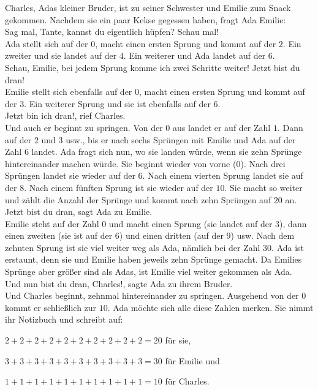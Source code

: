 Charles, Adas kleiner Bruder, ist zu seiner Schwester und Emilie zum Snack gekommen. Nachdem sie ein paar Kekse gegessen haben, fragt Ada Emilie: \\
\frqq{}Sag mal, Tante, kannst du eigentlich hüpfen? Schau mal!\flqq{}\\
Ada stellt sich auf der $0$, macht einen ersten Sprung und kommt auf der $2$. Ein zweiter und sie landet auf der $4$. Ein weiterer und Ada landet auf der $6$.\\
\frqq{}Schau, Emilie, bei jedem Sprung komme ich zwei Schritte weiter! Jetzt bist du dran!\flqq{}\\
Emilie stellt sich ebenfalls auf der $0$, macht einen ersten Sprung und kommt auf der $3$. Ein weiterer Sprung und sie ist ebenfalls auf der $6$.\\
\frqq{}Jetzt bin ich dran!\flqq{}, rief Charles.\\
Und auch er beginnt zu springen. Von der $0$ aus landet er auf der Zahl $1$. Dann auf der $2$ und $3$ usw., bis er nach sechs Sprüngen mit Emilie und Ada auf der Zahl $6$ landet.
Ada fragt sich nun, wo sie landen würde, wenn sie zehn Sprünge hintereinander machen würde. 
Sie beginnt wieder von vorne ($0$). Nach drei Sprüngen landet sie wieder auf der $6$. 
Nach einem vierten Sprung landet sie auf der $8$. 
Nach einem fünften Sprung ist sie wieder auf der $10$. Sie macht so weiter und zählt die Anzahl der Sprünge und kommt nach zehn Sprüngen auf $20$ an. \\
\frqq{}Jetzt bist du dran\flqq{}, sagt Ada zu Emilie.\\
Emilie steht auf der Zahl $0$ und macht einen Sprung (sie landet auf der $3$), dann einen zweiten (sie ist auf der $6$) und einen dritten (auf der $9$) usw. Nach dem zehnten Sprung ist sie viel weiter weg als Ada, nämlich bei der Zahl $30$.
Ada ist erstaunt, denn sie und Emilie haben jeweils zehn Sprünge gemacht. Da Emilies Sprünge aber größer sind als Adas, ist Emilie viel weiter gekommen als Ada.\\ 
\frqq{}Und nun bist du dran, Charles!\flqq{}, sagte Ada zu ihrem Bruder.\\
Und Charles beginnt, zehnmal hintereinander zu springen. Ausgehend von der $0$ kommt er schließlich zur $10$.
Ada möchte sich alle diese Zahlen merken. Sie nimmt ihr Notizbuch und schreibt auf:
\begin{description}[leftmargin=0.5cm]
    \item $2+2+2+2+2+2+2+2+2+2=20$ für sie,
    \item $3+3+3+3+3+3+3+3+3+3=30$ für Emilie und
    \item $1+1+1+1+1+1+1+1+1+1=10$ für Charles.
\end{description}
